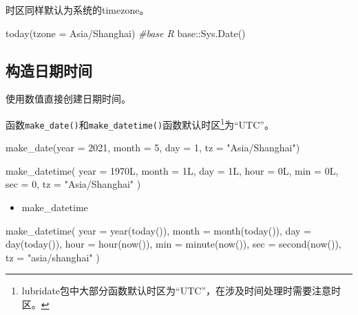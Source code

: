 \documentclass[
]{book}
\newenvironment{Shaded}{\begin{snugshade}}{\end{snugshade}}
\newcommand{\AttributeTok}[1]{\textcolor[rgb]{0.77,0.63,0.00}{#1}}
\newcommand{\CommentTok}[1]{\textcolor[rgb]{0.56,0.35,0.01}{\textit{#1}}}
\newcommand{\DecValTok}[1]{\textcolor[rgb]{0.00,0.00,0.81}{#1}}
\newcommand{\FunctionTok}[1]{\textcolor[rgb]{0.00,0.00,0.00}{#1}}
\newcommand{\NormalTok}[1]{#1}
\newcommand{\SpecialCharTok}[1]{\textcolor[rgb]{0.00,0.00,0.00}{#1}}
\newcommand{\StringTok}[1]{\textcolor[rgb]{0.31,0.60,0.02}{#1}}
\providecommand{\tightlist}{%
  \setlength{\itemsep}{0pt}\setlength{\parskip}{0pt}}
\begin{document}
时区同样默认为系统的timezone。

\begin{Shaded}
\begin{Highlighting}[]
\FunctionTok{today}\NormalTok{(}\AttributeTok{tzone =} \StringTok{\textquotesingle{}Asia/Shanghai\textquotesingle{}}\NormalTok{)}
\CommentTok{\#base R}
\NormalTok{base}\SpecialCharTok{::}\FunctionTok{Sys.Date}\NormalTok{()}
\end{Highlighting}
\end{Shaded}

\hypertarget{make-datetime}{%
\subsection{构造日期时间}\label{make-datetime}}

使用数值直接创建日期时间。

函数\texttt{make\_date()}和\texttt{make\_datetime()}函数默认时区\footnote{lubridate包中大部分函数默认时区为``UTC''，在涉及时间处理时需要注意时区。}为``UTC''。

\begin{Shaded}
\begin{Highlighting}[]
\FunctionTok{make\_date}\NormalTok{(}\AttributeTok{year =} \DecValTok{2021}\NormalTok{, }\AttributeTok{month =} \DecValTok{5}\NormalTok{, }\AttributeTok{day =} \DecValTok{1}\NormalTok{, }\AttributeTok{tz =} \StringTok{"Asia/Shanghai"}\NormalTok{)}

\FunctionTok{make\_datetime}\NormalTok{(}
  \AttributeTok{year =}\NormalTok{ 1970L,}
  \AttributeTok{month =}\NormalTok{ 1L,}
  \AttributeTok{day =}\NormalTok{ 1L,}
  \AttributeTok{hour =}\NormalTok{ 0L,}
  \AttributeTok{min =}\NormalTok{ 0L,}
  \AttributeTok{sec =} \DecValTok{0}\NormalTok{,}
  \AttributeTok{tz =} \StringTok{"Asia/Shanghai"}
\NormalTok{)}
\end{Highlighting}
\end{Shaded}

\begin{itemize}
\tightlist
\item
  make\_datetime
\end{itemize}

\begin{Shaded}
\begin{Highlighting}[]
\FunctionTok{make\_datetime}\NormalTok{(}
  \AttributeTok{year =} \FunctionTok{year}\NormalTok{(}\FunctionTok{today}\NormalTok{()),}
  \AttributeTok{month =} \FunctionTok{month}\NormalTok{(}\FunctionTok{today}\NormalTok{()),}
  \AttributeTok{day =} \FunctionTok{day}\NormalTok{(}\FunctionTok{today}\NormalTok{()),}
  \AttributeTok{hour =} \FunctionTok{hour}\NormalTok{(}\FunctionTok{now}\NormalTok{()),}
  \AttributeTok{min =} \FunctionTok{minute}\NormalTok{(}\FunctionTok{now}\NormalTok{()),}
  \AttributeTok{sec =} \FunctionTok{second}\NormalTok{(}\FunctionTok{now}\NormalTok{()),}
  \AttributeTok{tz =} \StringTok{"asia/shanghai"}
\NormalTok{)}
\end{Highlighting}
\end{Shaded}
\end{document}
